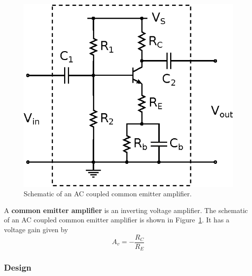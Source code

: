 \documentclass[11pt]{article}
\begin{document}
\begin{figure}[ht]
  \begin{center}
    \includegraphics{commonemitter.eps}
    \caption{Schematic of an AC coupled common emitter amplifier.}
    \label{fig:commonemitter}
  \end{center}
\end{figure}

A \textbf{common emitter amplifier} is an inverting voltage
amplifier. The schematic of an AC coupled common emitter amplifier is
shown in Figure~\ref{fig:commonemitter}.
It has a voltage gain given by
\begin{equation}
  A_v = -\frac{R_C}{R_E}
  \label{eq:commonemittergain}
\end{equation}

\subsubsection*{Design}
\end{document}
